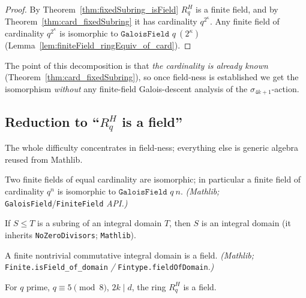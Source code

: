 \begin{proof}
\leanok{}
By Theorem~\ref{thm:fixedSubring_isField} $R_q^H$ is a finite field, and by
Theorem~\ref{thm:card_fixedSubring} it has cardinality $q^{2^\kappa}$. Any finite field of
cardinality $q^{2^\kappa}$ is isomorphic to $\texttt{GaloisField } q\ (2^\kappa)$
(Lemma~\ref{lem:finiteField_ringEquiv_of_card}).
\end{proof}

\noindent
The point of this decomposition is that \emph{the cardinality is already known}
(Theorem~\ref{thm:card_fixedSubring}), so once field-ness is established we get the isomorphism
\emph{without} any finite-field Galois-descent analysis of the $\sigma_{4k+1}$-action.

\subsection{Reduction to ``\texorpdfstring{$R_q^H$}{R\_q\^{}H} is a field''}

The whole difficulty concentrates in field-ness; everything else is generic algebra reused from
Mathlib.

\begin{lemma}\label{lem:finiteField_ringEquiv_of_card}
Two finite fields of equal cardinality are isomorphic; in particular a finite field of
cardinality $q^{n}$ is isomorphic to $\texttt{GaloisField } q\ n$. \emph{(Mathlib;}
\texttt{GaloisField}/\texttt{FiniteField} \emph{API.)}
\end{lemma}

\begin{lemma}\label{lem:subring_isDomain}
If $S \le T$ is a subring of an integral domain $T$, then $S$ is an integral domain
(it inherits \texttt{NoZeroDivisors}; \texttt{Mathlib}).
\end{lemma}

\begin{lemma}\label{lem:finite_domain_field}
A finite nontrivial commutative integral domain is a field. \emph{(Mathlib;}
\texttt{Finite.isField\_of\_domain} \emph{/} \texttt{Fintype.fieldOfDomain}.\emph{)}
\end{lemma}

\begin{theorem}[$R_q^H$ is a field]\label{thm:fixedSubring_isField}
\leanok
{}
For $q$ prime, $q \equiv 5 \pmod 8$, $2k \mid d$, the ring $R_q^H$ is a field.
\end{theorem}

